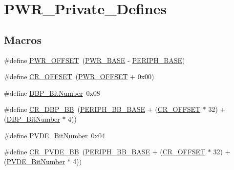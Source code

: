 \hypertarget{group___p_w_r___private___defines}{}\section{P\+W\+R\+\_\+\+Private\+\_\+\+Defines}
\label{group___p_w_r___private___defines}
\subsection*{Macros}
\begin{DoxyCompactItemize}
\item 
\#define \mbox{\hyperlink{group___p_w_r___private___defines_ga7f88bce73931300319824f22578f90de}{P\+W\+R\+\_\+\+O\+F\+F\+S\+ET}}~(\mbox{\hyperlink{group___peripheral__memory__map_gac691ec23dace8b7a649a25acb110217a}{P\+W\+R\+\_\+\+B\+A\+SE}} -\/ \mbox{\hyperlink{group___peripheral__memory__map_ga9171f49478fa86d932f89e78e73b88b0}{P\+E\+R\+I\+P\+H\+\_\+\+B\+A\+SE}})
\item 
\#define \mbox{\hyperlink{group___p_w_r___private___defines_gafa1d3d0ea72132df651c76fc1bdffffc}{C\+R\+\_\+\+O\+F\+F\+S\+ET}}~(\mbox{\hyperlink{group___p_w_r___private___defines_ga7f88bce73931300319824f22578f90de}{P\+W\+R\+\_\+\+O\+F\+F\+S\+ET}} + 0x00)
\item 
\#define \mbox{\hyperlink{group___p_w_r___private___defines_ga36ff45d972bf94f31f172fd53cf44d23}{D\+B\+P\+\_\+\+Bit\+Number}}~0x08
\item 
\#define \mbox{\hyperlink{group___p_w_r___private___defines_ga799ab60bdbcfc1076cf2d7f206d09b0c}{C\+R\+\_\+\+D\+B\+P\+\_\+\+BB}}~(\mbox{\hyperlink{group___peripheral__memory__map_gaed7efc100877000845c236ccdc9e144a}{P\+E\+R\+I\+P\+H\+\_\+\+B\+B\+\_\+\+B\+A\+SE}} + (\mbox{\hyperlink{group___r_c_c___private___defines_gafa1d3d0ea72132df651c76fc1bdffffc}{C\+R\+\_\+\+O\+F\+F\+S\+ET}} $\ast$ 32) + (\mbox{\hyperlink{group___p_w_r___private___defines_ga36ff45d972bf94f31f172fd53cf44d23}{D\+B\+P\+\_\+\+Bit\+Number}} $\ast$ 4))
\item 
\#define \mbox{\hyperlink{group___p_w_r___private___defines_ga17d618eb800c401ef9c6789c9374eaf8}{P\+V\+D\+E\+\_\+\+Bit\+Number}}~0x04
\item 
\#define \mbox{\hyperlink{group___p_w_r___private___defines_ga49f51ef8285a6be76fd204d49a00709c}{C\+R\+\_\+\+P\+V\+D\+E\+\_\+\+BB}}~(\mbox{\hyperlink{group___peripheral__memory__map_gaed7efc100877000845c236ccdc9e144a}{P\+E\+R\+I\+P\+H\+\_\+\+B\+B\+\_\+\+B\+A\+SE}} + (\mbox{\hyperlink{group___r_c_c___private___defines_gafa1d3d0ea72132df651c76fc1bdffffc}{C\+R\+\_\+\+O\+F\+F\+S\+ET}} $\ast$ 32) + (\mbox{\hyperlink{group___p_w_r___private___defines_ga17d618eb800c401ef9c6789c9374eaf8}{P\+V\+D\+E\+\_\+\+Bit\+Number}} $\ast$ 4))

\end{DoxyCompactItemize}
